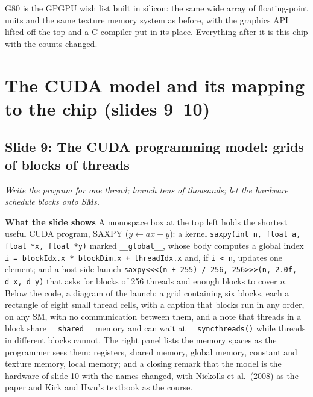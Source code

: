 \documentclass[11pt,letterpaper]{article}
\newcommand{\setstage}[1]{\colorlet{stagec}{#1}}
\newcommand{\slide}[3]{%
  \subsection[Slide #1: #2]{Slide #1: #2}%
  {\color{muted}\itshape #3\par}\medskip}
\newcommand{\para}[1]{\medskip\noindent\textbf{#1}\quad}
\newenvironment{intuition}{\begin{tcolorbox}[intuitionbox]}{\end{tcolorbox}}
\begin{document}
\begin{intuition}
G80 is the GPGPU wish list built in silicon: the same wide array of floating-point units and the same texture memory system as before, with the graphics API lifted off the top and a C compiler put in its place. Everything after it is this chip with the counts changed.
\end{intuition}
\setstage{attn}
\section{The CUDA model and its mapping to the chip (slides 9--10)}

\slide{9}{The CUDA programming model: grids of blocks of threads}{Write the program for one thread; launch tens of thousands; let the hardware schedule blocks onto SMs.}

\para{What the slide shows} A monospace box at the top left holds the shortest useful CUDA program, SAXPY ($y \leftarrow a x + y$): a kernel \texttt{saxpy(int n, float a, float *x, float *y)} marked \texttt{\_\_global\_\_}, whose body computes a global index \texttt{i = blockIdx.x * blockDim.x + threadIdx.x} and, if \texttt{i < n}, updates one element; and a host-side launch \texttt{saxpy<<<(n + 255) / 256, 256>>>(n, 2.0f, d\_x, d\_y)} that asks for blocks of 256 threads and enough blocks to cover $n$. Below the code, a diagram of the launch: a grid containing six blocks, each a rectangle of eight small thread cells, with a caption that blocks run in any order, on any SM, with no communication between them, and a note that threads in a block share \texttt{\_\_shared\_\_} memory and can wait at \texttt{\_\_syncthreads()} while threads in different blocks cannot. The right panel lists the memory spaces as the programmer sees them: registers, shared memory, global memory, constant and texture memory, local memory; and a closing remark that the model is the hardware of slide 10 with the names changed, with Nickolls et al.\ (2008) as the paper and Kirk and Hwu's textbook as the course.
\end{document}
